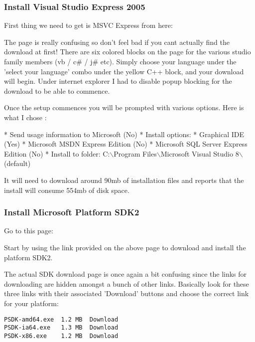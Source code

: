\hypertarget{toc94}{}
\subsubsection{Install Visual Studio Express 2005}
First thing we need to get is MSVC Express from here:


The page is really confusing so don't feel bad if you cant actually find the 
download at first! There are six colored blocks on the page for the various  
studio family members (vb / c\# / j\# etc). Simply choose your language under 
the 'select your language' combo under the yellow C++ block, and your download 
will begin. Under internet explorer I had to disable popup blocking for the 
download to be able to commence.

Once the setup commences you will be prompted with various options. Here is what 
I chose :

 * Send usage information to Microsoft    (No)
 * Install options:
   * Graphical IDE                        (Yes)
   * Microsoft MSDN Express Edition       (No)
   * Microsoft SQL Server Express Edition (No)
 * Install to folder: C:$\backslash$Program Files$\backslash$Microsoft Visual Studio 8$\backslash$   (default)

It will need to download around 90mb of installation files and reports 
that the install will consume 554mb of disk space.

\hypertarget{toc95}{}
\subsubsection{Install Microsoft Platform SDK2}
Go to this page:


Start by using the link provided on the above page to download and install the
platform SDK2.

The actual SDK download page is once again a bit confusing since the links for 
downloading are hidden amongst a bunch of other links. Basically look for these 
three links with their associated 'Download' buttons and choose the correct 
link for your platform:

\begin{verbatim}
PSDK-amd64.exe  1.2 MB  Download 
PSDK-ia64.exe   1.3 MB  Download 
PSDK-x86.exe    1.2 MB  Download
\end{verbatim}

